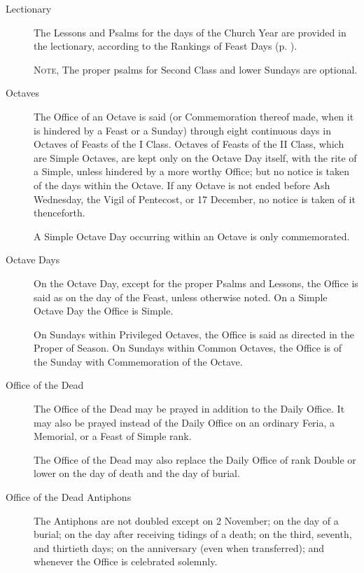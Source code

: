 \begin{description}
\item[Lectionary] The Lessons and Psalms for the days of the Church Year are provided in the lectionary, according to the Rankings of Feast Days (p. \pageref{ranking}).\par
\textsc{Note,} The proper psalms for Second Class and lower Sundays are optional.
\item[Octaves] The Office of an Octave is said (or Commemoration thereof made, when it is hindered by a Feast or a Sunday) through eight continuous days in Octaves of Feasts of the I Class. Octaves of Feasts of the II Class, which are Simple Octaves, are kept only on the Octave Day itself, with the rite of a Simple, unless hindered by a more worthy Office; but no notice is taken of the days within the Octave. If any Octave is not ended before Ash Wednesday, the Vigil of Pentecost, or 17 December, no notice is taken of it thenceforth.\par
A Simple Octave Day occurring within an Octave is only commemorated.
\item[Octave Days] On the Octave Day, except for the proper Psalms and Lessons, the Office is said as on the day of the Feast, unless otherwise noted. On a Simple Octave Day the Office is Simple.
\par
On Sundays within Privileged Octaves, the Office is said as directed in the Proper of Season. On Sundays within Common Octaves, the Office is of the Sunday with Commemoration of the Octave.
\item[Office of the Dead] The Office of the Dead may be prayed in addition to the Daily Office. It may also be prayed instead of the Daily Office on an ordinary Feria, a Memorial, or a Feast of Simple rank.\par
The Office of the Dead may also replace the Daily Office of rank Double or lower on the day of death and the day of burial.
\item[Office of the Dead Antiphons] The Antiphons are not doubled except on 2 November; %
on the day of a burial; on the day after receiving tidings of a death; on the third, seventh, and thirtieth days; on the anniversary (even when transferred); and whenever the Office is celebrated solemnly.

\end{description}
